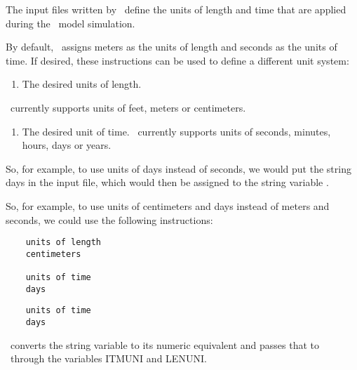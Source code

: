 \label{section:Units}
The input files written by \mut\ define the units of length and time that are applied during the \mfus\ model simulation.

By default, \mut\ assigns meters as the units of length and seconds as the units of time. If desired, these instructions can be used to define a different unit system:

    {
        \squish
        \begin{enumerate}
        \item {}  The desired units of length.  
        \end{enumerate}
        \mfus\ currently supports units of feet, meters or centimeters.
        }

    {
        \squish
        \begin{enumerate}
        \item {}  The desired unit of time. \mfus\ currently supports units of seconds, minutes, hours, days or years.
        \end{enumerate}

        So, for example, to use units of days instead of seconds, we would put the string \textsf{days} in the input file,
          which would then be assigned to the string variable .
        \squish
    }
    
So, for example, to use units of centimeters and days instead of meters and seconds, we could use the following instructions:
 \begin{verbatim}
    units of length
    centimeters

    units of time
    days
 \end{verbatim}

 \begin{verbatim}
    units of time
    days
 \end{verbatim}
 
\mut\ converts the string variable  to its numeric equivalent and passes that to \mfus\ through the variables \textsf{ITMUNI} and \textsf{LENUNI}.
